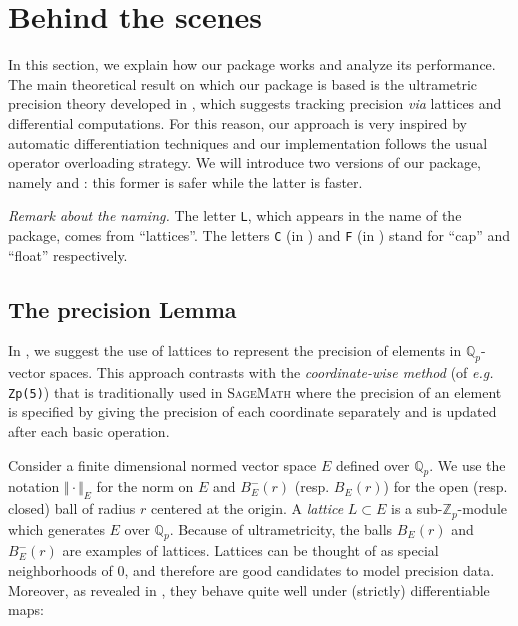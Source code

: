 \documentclass[sigconf]{acmart}
\newcommand{\Z}{\mathbb Z}
\newcommand{\Zp}{\Z_p}
\newcommand{\Q}{\mathbb Q}
\newcommand{\Qp}{\Q_p}
\newcommand{\sage}{\textsc{SageMath}\xspace}
\newcommand{\ZpL}{\text{\color{output} \rm \tt ZpL}\xspace}
\newcommand{\ZpLC}{\text{\color{output} \rm \tt ZpLC}\xspace}
\newcommand{\ZpLF}{\text{\color{output} \rm \tt ZpLF}\xspace}
\theoremstyle{definition}
\begin{document}
\section{Behind the scenes}
\label{sec:implementation}

In this section, we explain how our package \ZpL works and analyze
its performance.
The main theoretical result on which our package is based is the 
ultrametric precision theory developed in \cite{caruso-roe-vaccon:14a}, which 
suggests tracking precision \emph{via} lattices and differential 
computations. For this reason, our approach is very inspired by 
automatic differentiation techniques \cite{rall:1981} and our implementation 
follows the usual operator overloading strategy.
We will introduce two versions of our package, namely \ZpLC and \ZpLF: 
this former is safer while the latter is faster.

\smallskip

\noindent \textit{Remark about the naming.}
%
The letter \texttt{L}, which appears in the name of the package, 
comes from ``lattices''. The letters \texttt{C} (in \ZpLC) and 
\texttt{F} (in \ZpLF) stand for ``cap'' and ``float'' respectively.

\subsection{The precision Lemma}
\label{ssec:preclemma}

In \cite{caruso-roe-vaccon:14a}, we suggest the 
use of lattices to represent the precision of elements in 
$\Qp$-vector spaces.  This approach contrasts with the
\emph{coordinate-wise method} (of \textit{e.g.}
 \verb?Zp(5)?) that is traditionally used in \sage
where the precision of an element is specified by giving the precision
of each coordinate separately and is updated after each basic
operation.

Consider a finite dimensional normed vector space $E$ defined over 
$\Qp$. We use the notation $\Vert \cdot \Vert_E$ for the norm on $E$ and 
$B^-_E(r)$ (resp. $B^{\phantom -}_E(r)$) for the open (resp. closed) 
ball of radius $r$ centered at the origin. A \emph{lattice} $L \subset 
E$ is a sub-$\Zp$-module which generates $E$ over $\Qp$. Because of 
ultrametricity, the balls $B^{\phantom -}_E(r)$ and $B^-_E(r)$ are 
examples of lattices. Lattices can be thought of as special 
neighborhoods of $0$, and therefore are good candidates to model 
precision data. Moreover, as revealed in \cite{caruso-roe-vaccon:14a}, 
they behave quite well under (strictly) differentiable maps:
\end{document}
